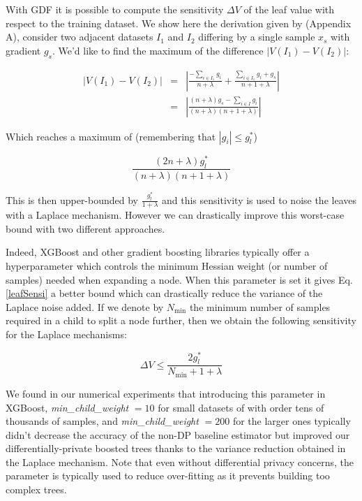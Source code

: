 \documentclass{article}
\theoremstyle{definition}
\begin{document}
With GDF it is possible to compute the sensitivity $\Delta V$ of the leaf value with respect to the training dataset. We show here the derivation given by \cite{li2020privacy} (Appendix A), consider two adjacent datasets $I_1$ and $I_2$ differing by a single sample $x_s$ with gradient $g_s$. We'd like to find the maximum of the difference $\vert V(I_1) - V(I_2) \vert$:

\begin{eqnarray*}
\vert V(I_1) - V(I_2) \vert &=& \left\vert \frac{-\sum_{i \in I_1} g_i }{n+\lambda} + \frac{\sum_{i \in I_1} g_i + g_s}{n+1+\lambda} \right\vert \\
 &=& \left\vert \frac{ (n+\lambda)g_s - \sum_{i \in I} g_i}{(n+\lambda)(n+1+\lambda)} \right\vert  
\end{eqnarray*} 

Which reaches a maximum of (remembering that $|g_i| \leq g_l^*$)  

\begin{equation}
\frac{(2n+\lambda)g_l^*}{(n+\lambda)(n+1+\lambda)} 
\label{leafSensi}
\end{equation} 

This is then upper-bounded by $\frac{g_l^*}{1+\lambda}$ and this sensitivity is used to noise the leaves with a Laplace mechanism. However we
can drastically improve this worst-case bound with two different approaches. \smallskip 

Indeed, XGBoost and other gradient boosting libraries typically offer a hyperparameter which controls the minimum Hessian weight (or number of samples) needed when expanding a node. When this parameter is set it gives Eq. \ref{leafSensi} a better bound which can drastically reduce
the variance of the Laplace noise added. If we denote by $N_{\text{min}}$ the minimum number of samples required in a child to split a node further, then we obtain the following sensitivity for the Laplace mechanisms: 

\begin{equation}
\Delta V \leq \frac{2 g_l^*}{N_{\text{min}} + 1 + \lambda} 
\end{equation} 

We found in our numerical experiments that introducing this parameter in XGBoost, \textit{min\_child\_weight} $= 10$ for small
datasets of with order tens of thousands of samples, and \textit{min\_child\_weight} $= 200$ for the larger ones typically didn't decrease the accuracy of the non-DP baseline estimator but improved our differentially-private boosted trees thanks to the variance reduction obtained in the Laplace mechanism. Note that even without differential privacy concerns, the parameter is typically
used to reduce over-fitting as it prevents building too complex trees.  \smallskip 
\end{document}

